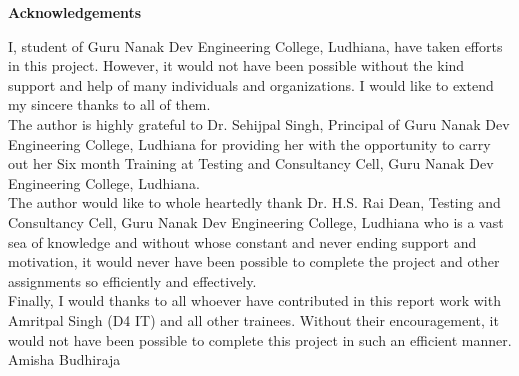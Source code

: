\begin{center}
{\Huge \bf{Acknowledgements}\vskip 0.2in}
\end{center}

I, student of Guru Nanak Dev Engineering College, Ludhiana, have taken efforts in this project.
However, it would not have been possible without the kind support and help of many individuals
and organizations. I would like to extend my sincere thanks to all of them.\\

The author is highly grateful to Dr. Sehijpal Singh, Principal of Guru Nanak Dev Engineering College, Ludhiana for providing her with the opportunity to carry out her Six month Training at
Testing and Consultancy Cell, Guru Nanak Dev Engineering College, Ludhiana.\\



The author would like to whole heartedly thank Dr. H.S. Rai Dean, Testing and Consultancy
Cell, Guru Nanak Dev Engineering College, Ludhiana who is a vast sea of knowledge and without whose constant and never ending support and motivation, it would never have been possible to complete the project and other assignments so efficiently and effectively.\\

Finally, I would thanks to all whoever have contributed in this report work with Amritpal Singh
(D4 IT) and all other trainees. Without their encouragement, it would not have been possible
to complete this project in such an efficient manner.\\


\vskip 1.0cm 
\noindent Amisha Budhiraja



